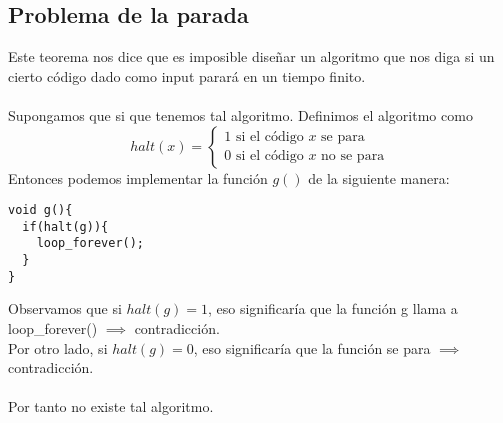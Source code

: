 \documentclass{myclass}
\begin{document}
\subsection{Problema de la parada}
Este teorema nos dice que es imposible diseñar un algoritmo que nos diga si un cierto código dado como input parará en un tiempo finito.\\
\\
Supongamos que si que tenemos tal algoritmo. Definimos el algoritmo como
\[
halt(x) = \begin{cases}
  1 \text{ si el código } x \text{ se para}\\
  0 \text{ si el código } x \text{ no se para}
\end{cases}
\] 
Entonces podemos implementar la función $g()$ de la siguiente manera:
\begin{lstlisting}
void g(){
  if(halt(g)){
	loop_forever();
  }
}
\end{lstlisting}
Observamos que si $halt(g)=1$, eso significaría que la función g llama a loop_forever() $\implies$ contradicción.\\
Por otro lado, si $halt(g)=0$, eso significaría que la función se para $\implies$ contradicción.\\
\\
Por tanto no existe tal algoritmo.
\end{document}
